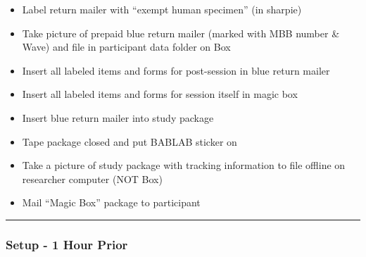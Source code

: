 \documentclass[]{book}
\begin{document}
\begin{itemize}
\item
  Label return mailer with ``exempt human specimen'' (in sharpie)
\item
  Take picture of prepaid blue return mailer (marked with MBB number \& Wave) and file in participant data folder on Box
\item
  Insert all labeled items and forms for post-session in blue return mailer
\item
  Insert all labeled items and forms for session itself in magic box
\item
  Insert blue return mailer into study package
\item
  Tape package closed and put BABLAB sticker on
\item
  Take a picture of study package with tracking information to file offline on researcher computer (NOT Box)
\item
  Mail ``Magic Box'' package to participant
\end{itemize}

\begin{center}\rule{0.5\linewidth}{0.5pt}\end{center}

\hypertarget{setup---1-hour-prior}{%
\subsubsection{Setup - 1 Hour Prior}\label{setup---1-hour-prior}}
\end{document}
